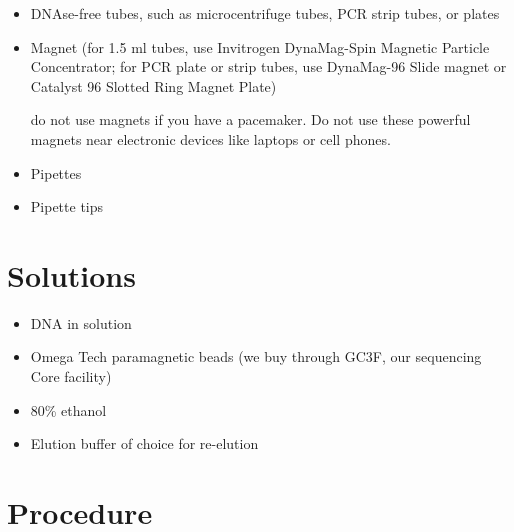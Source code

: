 \documentclass[
  letterpaper,
  DIV=11,
  numbers=noendperiod]{scrreprt}
\providecommand{\tightlist}{%
  \setlength{\itemsep}{0pt}\setlength{\parskip}{0pt}}\usepackage{longtable,booktabs,array}
\begin{document}
\begin{itemize}
\item
  DNAse-free tubes, such as microcentrifuge tubes, PCR strip tubes, or
  plates
\item
  Magnet (for 1.5 ml tubes, use Invitrogen DynaMag-Spin Magnetic
  Particle Concentrator; for PCR plate or strip tubes, use DynaMag-96
  Slide magnet or Catalyst 96 Slotted Ring Magnet Plate)

  \begin{tcolorbox}[enhanced jigsaw, rightrule=.15mm, title=\textcolor{quarto-callout-important-color}{\faExclamation}\hspace{0.5em}{This is important}, titlerule=0mm, opacitybacktitle=0.6, toprule=.15mm, bottomrule=.15mm, opacityback=0, left=2mm, colframe=quarto-callout-important-color-frame, breakable, coltitle=black, colback=white, colbacktitle=quarto-callout-important-color!10!white, bottomtitle=1mm, leftrule=.75mm, toptitle=1mm, arc=.35mm]

  do not use magnets if you have a pacemaker. Do not use these powerful
  magnets near electronic devices like laptops or cell phones.

  \end{tcolorbox}
\item
  Pipettes
\item
  Pipette tips
\end{itemize}

\hypertarget{solutions-18}{%
\section{Solutions}\label{solutions-18}}

\begin{itemize}
\tightlist
\item
  DNA in solution
\item
  Omega Tech paramagnetic beads (we buy through GC3F, our sequencing
  Core facility)
\item
  80\% ethanol
\item
  Elution buffer of choice for re-elution
\end{itemize}

\hypertarget{procedure-19}{%
\section{Procedure}\label{procedure-19}}
\end{document}
